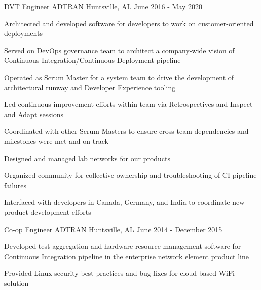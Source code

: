 
\begin{cventries}
  \cventry
    {DVT Engineer} %
    {ADTRAN} %
    {Huntsville, AL} %
    {June 2016 - May 2020} %
    {
      \begin{cvitems} %
        \item {Architected and developed software for developers to work on customer-oriented deployments}
        \item {Served on DevOps governance team to architect a company-wide vision of Continuous Integration/Continuous Deployment pipeline}
        \item {Operated as Scrum Master for a system team to drive the development of architectural runway and Developer Experience tooling}
        \item {Led continuous improvement efforts within team via Retrospectives and Inspect and Adapt sessions}
        \item {Coordinated with other Scrum Masters to ensure cross-team dependencies and milestones were met and on track}
        \item {Designed and managed lab networks for our products}
        \item {Organized community for collective ownership and troubleshooting of CI pipeline failures}
        \item {Interfaced with developers in Canada, Germany, and India to coordinate new product development efforts}
      \end{cvitems}
    }

  \cventry
    {Co-op Engineer} %
    {ADTRAN} %
    {Huntsville, AL} %
    {June 2014 - December 2015} %
    {
      \begin{cvitems} %
        \item {Developed test aggregation and hardware resource management software for Continuous Integration pipeline in the enterprise network element product line}
        \item {Provided Linux security best practices and bug-fixes for cloud-based WiFi solution}
      \end{cvitems}
    }
\end{cventries}
